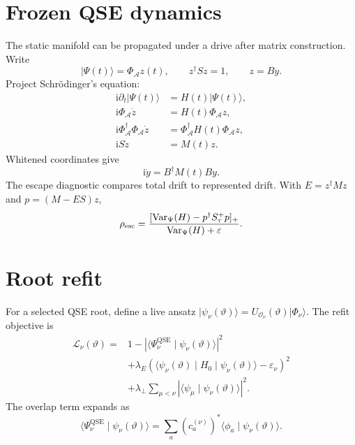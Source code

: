 \documentclass[10pt,twocolumn]{article}
\newcommand{\Oset}{\mathcal O}
\newcommand{\Acal}{\mathcal A}
\newcommand{\qse}{\mathrm{QSE}}
\newcommand{\eps}{\varepsilon}
\newcommand{\ii}{\mathrm i}
\newcommand{\Var}{\operatorname{Var}}
\newcommand{\ket}[1]{\lvert #1\rangle}
\newcommand{\braket}[2]{\langle #1\mid #2\rangle}
\newcommand{\matel}[3]{\langle #1\mid #2\mid #3\rangle}
\begin{document}
\section{Frozen QSE dynamics}

The static manifold can be propagated under a drive after matrix construction. Write
\begin{equation}
\ket{\Psi(t)}=\Phi_\Acal z(t),
\qquad
z^\dagger Sz=1,
\qquad
z=By.
\label{eq:frozen_state}
\end{equation}
Project Schrödinger's equation:
\begin{equation}
\begin{aligned}
\ii\partial_t\ket{\Psi(t)}&=H(t)\ket{\Psi(t)},\\
\ii\Phi_\Acal\dot z&=H(t)\Phi_\Acal z,\\
\ii\Phi_\Acal^\dagger\Phi_\Acal\dot z&=\Phi_\Acal^\dagger H(t)\Phi_\Acal z,\\
\ii S\dot z&=M(t)z.
\end{aligned}
\label{eq:frozen_project}
\end{equation}
Whitened coordinates give
\begin{equation}
\ii\dot y=B^\dagger M(t)B y.
\label{eq:frozen_white}
\end{equation}
The escape diagnostic compares total drift to represented drift. With \(E=z^\dagger Mz\) and \(p=(M-ES)z\),
\begin{equation}
\rho_{\rm esc}=\frac{[\Var_\Psi(H)-p^\dagger S_\tau^+p]_+}{\Var_\Psi(H)+\eps}.
\label{eq:escape}
\end{equation}

\section{Root refit}

For a selected QSE root, define a live ansatz \(\ket{\psi_\nu(\vartheta)}=U_{\Oset_\nu}(\vartheta)\ket{\Phi_\nu}\). The refit objective is
\begin{equation}
\begin{aligned}
\mathcal L_\nu(\vartheta)
={}&1-|\braket{\Psi_\nu^{\qse}}{\psi_\nu(\vartheta)}|^2\\
&+\lambda_E( \matel{\psi_\nu(\vartheta)}{H_0}{\psi_\nu(\vartheta)}-\varepsilon_\nu)^2\\
&+\lambda_\perp\sum_{\mu<\nu}|\braket{\psi_\mu}{\psi_\nu(\vartheta)}|^2.
\end{aligned}
\label{eq:refit}
\end{equation}
The overlap term expands as
\begin{equation}
\braket{\Psi_\nu^{\qse}}{\psi_\nu(\vartheta)}
=\sum_a(c_a^{(\nu)})^*\braket{\phi_a}{\psi_\nu(\vartheta)}.
\label{eq:refit_overlap}
\end{equation}
\end{document}
